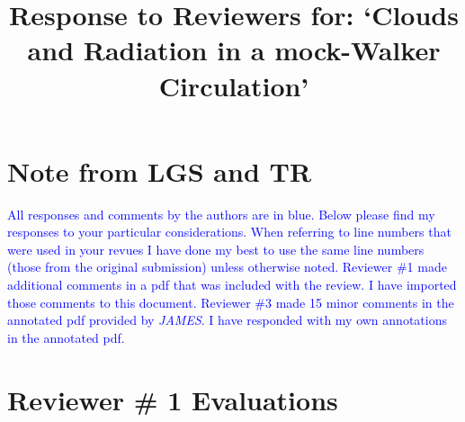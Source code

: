 \documentclass[draft]{agujournal2019}
\begin{document}
\title{Response to Reviewers for: `Clouds and Radiation in a mock-Walker Circulation'}

%
%















\section{Note from LGS and TR}

\textcolor{blue}{All responses and comments by the authors are in blue.  Below please find my responses to your particular considerations.  When referring to line numbers that were used in your revues I have done my best to use the same line numbers (those from the original submission) unless otherwise
noted.  Reviewer \#1 made additional comments in a pdf that was included with the review.  I have imported those comments to this document.  Reviewer \#3 made 15 minor comments in the annotated pdf provided by \textit{JAMES}.  I have responded with my own annotations in the annotated pdf. }

\section{Reviewer \# 1 Evaluations}
\end{document}
